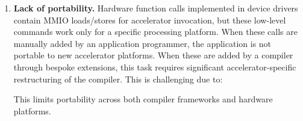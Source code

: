 \begin{enumerate}[label=\textbf{G\arabic{*}}, leftmargin=*]

  \item \textbf{Lack of portability.} 
  \label{gap.portability}
  Hardware function calls implemented in device drivers contain MMIO loads/stores for accelerator invocation,
  but these low-level commands work only for a specific processing platform.
  When these calls %
  are manually added by an application programmer, 
  the application is not portable to new accelerator platforms. 
  When these are added by a compiler through bespoke extensions, 
  this task requires significant accelerator-specific restructuring of the compiler. This is challenging due to:
  This limits portability across both compiler frameworks and hardware platforms.



\end{enumerate}

